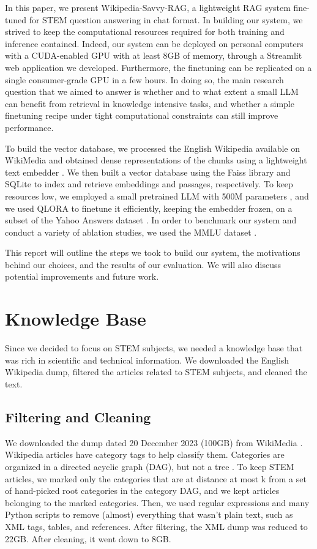 \documentclass[11pt]{article}
\begin{document}
In this paper, we present Wikipedia-Savvy-RAG, a lightweight RAG system fine-tuned for STEM question answering
in chat format. In building our system, we strived to keep the computational resources required for both
training and inference contained. Indeed, our system can be deployed on personal computers with a CUDA-enabled GPU
with at least 8GB of memory, through a Streamlit web application we developed. Furthermore, the finetuning can 
be replicated on a single consumer-grade GPU in a few hours. In doing so, the main research question that we aimed to
answer is whether and to what extent a small LLM can benefit from retrieval in knowledge intensive tasks, and whether a
simple finetuning recipe under tight computational constraints can still improve performance. 

To build the vector database, we processed the English Wikipedia available on WikiMedia \cite{wikimedia} and obtained 
dense representations of the chunks using a lightweight text embedder \cite{baai}. We then built a vector database using
the Faiss library \cite{faiss} and SQLite \cite{sqlite} to index and retrieve embeddings and passages, respectively. To keep resources low,
we employed a small pretrained LLM with 500M parameters \cite{qwen}, and we used QLORA \cite{qlora} to finetune it efficiently, 
keeping the embedder frozen, on a subset of the Yahoo Answers dataset \cite{yahoo_answers}.
In order to benchmark our system and conduct a variety of ablation studies, we used the MMLU dataset \cite{mmlu}.

This report will outline the steps we took to build our system, the motivations behind our choices, and the results of our evaluation.
We will also discuss potential improvements and future work.

\section{Knowledge Base}

Since we decided to focus on STEM subjects, we needed a knowledge base that was rich in scientific and technical information.
We downloaded the English Wikipedia dump, filtered the articles related to STEM subjects, and cleaned the text.

\subsection{Filtering and Cleaning}

We downloaded the dump dated 20 December 2023 (100GB) from WikiMedia \cite{wikimedia}. Wikipedia articles have category tags to help classify them.
Categories are organized in a directed acyclic graph (DAG), but not a tree \cite{wikipedia_category_tree}. To keep STEM articles, we marked only the categories that are at
distance at most k from a set of hand-picked root categories in the category DAG, and we kept articles belonging to the marked categories.
Then, we used regular expressions and many Python scripts to remove (almost) everything that wasn't plain text, such as XML tags, tables, and references. After filtering, the XML
dump was reduced to 22GB. After cleaning, it went down to 8GB.
\end{document}
